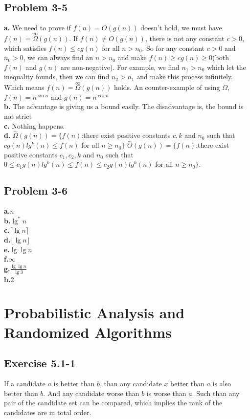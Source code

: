 \documentclass[12pt]{article}
\theoremstyle{definition}
\theoremstyle{remark}
\begin{document}
\subsection*{Problem 3-5}
\textbf{a.} We need to prove if $f(n)=O(g(n))$ doesn't hold, we must have $f(n)=\overset{\infty}{\Omega}(g(n))$. If $f(n)\ne O(g(n))$, there is not any constant $c>0$, which satisfies $f(n)\le cg(n)$ for all $n>n_0$. So for any constant $c>0$ and $n_0>0$, we can always find an $n>n_0$ and make $f(n)\ge cg(n)\ge0$(both $f(n)$ and $g(n)$ are non-negative). For example, we find $n_1>n_0$ which let the inequality founds, then we can find $n_2>n_1$ and make this process infinitely. Which means $f(n)=\overset{\infty}{\Omega}(g(n))$ holds. An counter-example of using $\Omega$, $f(n)=n^{\sin n}$ and $g(n)=n^{\cos n}$\\
\textbf{b.} The advantage is giving us a bound easily. The disadvantage is, the bound is not strict\\
\textbf{c.} Nothing happens.\\
\textbf{d.} $\overset{\sim}{\Omega}(g(n))=\{f(n)$:there exist positive constants $c,k$ and $n_0$ such that $cg(n)lg^k(n)\le f(n)$ for all $n\ge n_0\}$ $\overset{\sim}{\Theta}(g(n))=\{f(n)$:there exist positive constants $c_1,c_2,k$ and $n_0$ such that $0\le c_1g(n)lg^k(n)\le f(n)\le c_2g(n)lg^k(n)$ for all $n\ge n_0\}$.
\subsection*{Problem 3-6}
\textbf{a.}$n$\\
\textbf{b.}$\lg^*n$\\
\textbf{c.}$\lceil \lg n\rceil$\\
\textbf{d.}$\lfloor \lg n\rfloor$\\
\textbf{e.}$\lg\lg{n}$\\
\textbf{f.}$\infty$\\
\textbf{g.}$\frac{\lg\lg n}{\lg3}$\\
\textbf{h.}2
\section{Probabilistic Analysis and Randomized Algorithms}
\subsection*{Exercise 5.1-1}
If a candidate $a$ is better than $b$, than any candidate $x$ better than $a$ is also better than $b$. And any candidate worse than $b$ is worse than $a$. Such than any pair of the candidate set can be compared, which implies the rank of the candidates are in total order.
\end{document}
